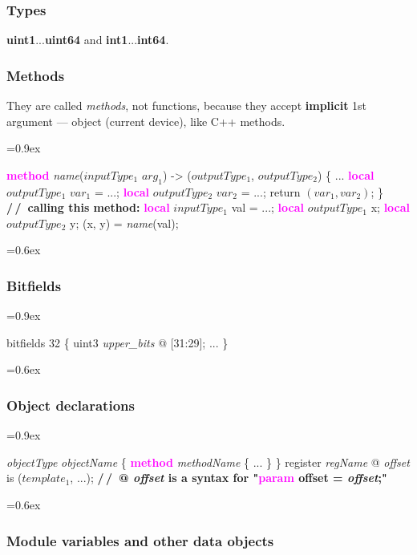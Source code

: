 \documentclass[8pt]{extarticle}
\newenvironment{code}[1][]{%
\begin{prebox}[#1]\obeylines%
\fontdimen2\font=0.9ex%
}{%
\end{prebox}%
\fontdimen2\font=0.6ex%
}
\newcommand{\ind}{\hphantom{~~~}}
\newcommand{\kw}[1]{\textcolor{magenta}{\textbf{#1}}}
\newcommand{\ty}[1]{\textcolor{myOrange}{\textbf{#1}}}
\newcommand{\cmtcommon}[1]{\textcolor{Sepia}{\textbf{#1}}}
\newcommand{\cmtd}[1]{\cmtcommon{/\,/\ #1}}
\newcommand{\p}[1]{\textit{\large#1}}
\newcommand{\vshort}[1]{%
\vspace{-0.6em}%
#1%
\vspace{-0.3em}}
\begin{document}
\begin{multicols*}{3}
    \subsubsection{Types}
    \ty{uint1}...\ty{uint64} and \ty{int1}...\ty{int64}.

    \subsubsection{Methods}
    They are called \textit{methods}, not functions, because
    they accept \textbf{implicit} 1st argument — object (current
    device), like C++ methods.
    \begin{code}
        \kw{method} \p{name}($inputType_1$ $arg_1$) -> ($outputType_1$, $outputType_2$) \{
            \vshort{\ind ...}
            \ind \kw{local} $outputType_1$ $var_1$ = ...; \kw{local} $outputType_2$ $var_2$ = ...;
            \ind return $(var_1, var_2)$;
        \}
        \cmtd{calling this method:}
        \kw{local} $inputType_1$ val = ...;
        \kw{local} $outputType_1$ x; \kw{local} $outputType_2$ y;
        (x, y) = \p{name}(val);
    \end{code}

    \subsubsection{Bitfields}
    \begin{code}
        bitfields 32 \{
            \ind uint3 \p{upper_bits} @ [31:29];
            \vshort{\ind ...}
        \}
    \end{code}

    \subsubsection{Object declarations}
    \begin{code}
        \p{objectType} \p{objectName} \{
            \ind \kw{method} \p{methodName} \{
            \ind     \vshort{\ind \ind ...}
            \ind \}
        \}
        register \p{regName} @ \p{offset} is ($template_1$, ...);
        \cmtd{@ \p{offset} is a syntax for "\kw{param} offset = \p{offset};"}
    \end{code}

\subsubsection{Module variables and other data objects}


\end{multicols*}
\end{document}
